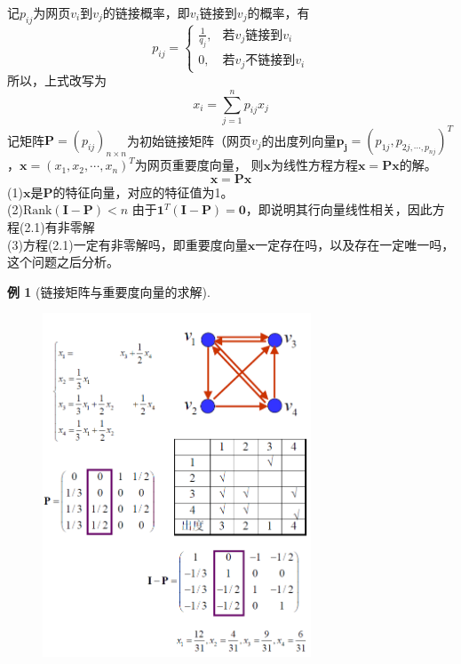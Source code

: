 \documentclass[10t, a4paper, oneside]{ctexbook}
\newtheorem{example}[theorem]{例}
\begin{document}
\noindent 记$p_{ij}$为网页$v_i$到$v_j$的链接概率，即$v_i$链接到$v_j$的概率，有
$$p_{ij}=\begin{cases}
\frac{1}{q_j},&\text{若}v_j\text{链接到}v_i\\
0,&\text{若}v_j\text{不链接到}v_i
\end{cases}$$
所以，上式改写为
$$x_i=\sum_{j=1}^np_{ij}x_j$$
记矩阵$\mathbf{P}=(p_{ij})_{n\times n}$为初始链接矩阵（网页$v_j$的出度列向量$\mathbf{p_j} = (p_{1j},p_{2j,\cdots,p_{nj}})^T$，$\mathbf{x}=(x_1,x_2,\cdots,x_n)^T$为网页重要度向量，
则$\mathbf{x}$为线性方程方程$\mathbf{x}=\mathbf{P}\mathbf{x}$的解。
\begin{equation}
    \mathbf{x}=\mathbf{P}\mathbf{x}
\end{equation}
\noindent(1)$\mathbf{x}$是$\mathbf{P}$的特征向量，对应的特征值为1。\\
(2)$\text{Rank}(\mathbf{I}-\mathbf{P})<n$ 由于$\mathbf{1}^T(\mathbf{I}-\mathbf{P}) = \mathbf{0}$，即说明其行向量线性相关，因此方程(2.1)有非零解\\
(3)方程(2.1)一定有非零解吗，即重要度向量$\mathbf{x}$一定存在吗，以及存在一定唯一吗，这个问题之后分析。
\begin{example}[链接矩阵与重要度向量的求解]
    \begin{figure}[H]
        \centering
        \includegraphics[width=8cm]{assets/网页重要度例题.png}
    \end{figure}
\end{example}
\end{document}
